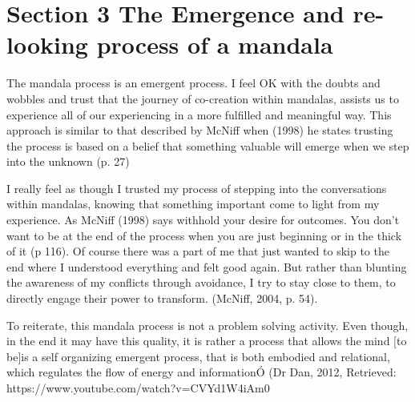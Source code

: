 
\chapter{Section 3 
The Emergence and re-looking process of a mandala}


The mandala process is an emergent process. I feel OK with the doubts and wobbles and trust that the journey of co-creation within mandalas, assists us to experience all of our experiencing in a more fulfilled and meaningful way. This approach is similar to that described by McNiff when (1998) he states trusting the process is based on a belief that something valuable will emerge when we step into the unknown (p. 27) 

I really feel as though I trusted my process of stepping into the conversations within mandalas, knowing that something important come to light from my experience. As McNiff (1998) says withhold your desire for outcomes. You don't want to be at the end of the process when you are just beginning or in the thick of it (p 116). Of course there was a part of me that just wanted to skip to the end where I understood everything and felt good again. But rather than blunting the awareness of my conflicts through avoidance, I try to stay close to them, to directly engage their power to transform. (McNiff, 2004, p. 54). 

To reiterate, this mandala process is not a problem solving activity. Even though, in the end it may have this quality, it is rather a process that allows the mind [to be]is a self organizing emergent process, that is both embodied and relational, which regulates the flow of energy and informationÓ (Dr Dan, 2012, Retrieved: https://www.youtube.com/watch?v=CVYd1W4iAm0 


